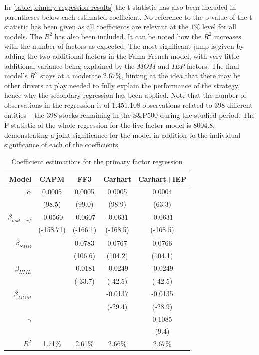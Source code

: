In \autoref{table:primary-regression-results} the t-statistic has also been included in parentheses below each estimated coefficient. No reference to the p-value of the t-statistic has been given as all coefficients are relevant at the $1\%$ level for all models. The $R^2$ has also been included. It can be noted how the $R^2$ increases with the number of factors as expected. The most significant jump is given by adding the two additional factors in the Fama-French model, with very little additional variance being explained by the $MOM$ and $IEP$ factors. The final model's $R^2$ stays at a moderate $2.67\%$, hinting at the idea that there may be other drivers at play needed to fully explain the performance of the strategy, hence why the secondary regression has been applied. Note that the number of observations in the regression is of 1.451.108 observations related to 398 different entities -- the 398 stocks remaining in the S\&P500 during the studied period. The F-statistic of the whole regression for the five factor model is 8004.8, demonstrating a joint significance for the model in addition to the individual significance of each of the coefficients. 

\begin{table}[ht]
    \centering
    \begin{tabular}{rcccc}
        \toprule
        Model & CAPM & FF3 & Carhart & Carhart+IEP \\ 
        \midrule
        $\alpha$ & 0.0005 & 0.0005 & 0.0005 & 0.0004 \\
                 & (98.5) & (99.0) & (98.9) & (63.3) \\[8px]
        $\beta_{mkt-rf}$ & -0.0560 & -0.0607 & -0.0631 & -0.0631 \\
                         & (-158.71) & (-166.1) & (-168.5) & (-168.5) \\[8px]
        $\beta_{SMB}$ & & 0.0783 & 0.0767 & 0.0766 \\
                      & & (106.6) & (104.2) & (104.1) \\[8px]
        $\beta_{HML}$ & & -0.0181 & -0.0249 & -0.0249 \\
                      & & (-33.7) & (-42.5) & (-42.5) \\[8px]
        $\beta_{MOM}$ & & & -0.0137 & -0.0135 \\
                      & & & (-29.4) & (-28.9) \\[8px]
        $\gamma$ & & & & 0.1085 \\
                       & & & & (9.4) \\[8px]
        \midrule
        $R^2$ & 1.71\% & 2.61\% & 2.66\% & 2.67\% \\

        \bottomrule
    \end{tabular}
    \caption{Coefficient estimations for the primary factor regression}
    \label{table:primary-regression-results}
\end{table}

